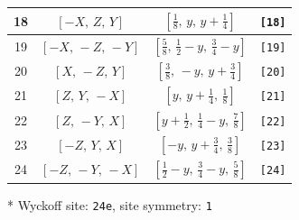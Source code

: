 \documentclass[fleqn,8pt]{jsarticle}
\begin{document}
\begin{longtable}{cccc}
18 & $\left[ - X,\, Z,\, Y \right]$ & $\left[ \frac{1}{8},\, y,\, y + \frac{1}{4} \right]$ & {\tt [18]} \\ \hline
19 & $\left[ - X,\, - Z,\, - Y \right]$ & $\left[ \frac{5}{8},\, \frac{1}{2} - y,\, \frac{3}{4} - y \right]$ & {\tt [19]} \\ \hline
20 & $\left[ X,\, - Z,\, Y \right]$ & $\left[ \frac{3}{8},\, - y,\, y + \frac{3}{4} \right]$ & {\tt [20]} \\ \hline
21 & $\left[ Z,\, Y,\, - X \right]$ & $\left[ y,\, y + \frac{1}{4},\, \frac{1}{8} \right]$ & {\tt [21]} \\ \hline
22 & $\left[ Z,\, - Y,\, X \right]$ & $\left[ y + \frac{1}{2},\, \frac{1}{4} - y,\, \frac{7}{8} \right]$ & {\tt [22]} \\ \hline
23 & $\left[ - Z,\, Y,\, X \right]$ & $\left[ - y,\, y + \frac{3}{4},\, \frac{3}{8} \right]$ & {\tt [23]} \\ \hline
24 & $\left[ - Z,\, - Y,\, - X \right]$ & $\left[ \frac{1}{2} - y,\, \frac{3}{4} - y,\, \frac{5}{8} \right]$ & {\tt [24]} \\
\end{longtable}
* Wyckoff site: {\tt 24e}, site symmetry: {\tt 1}
\renewcommand{\arraystretch}{1.2}
\end{document}
